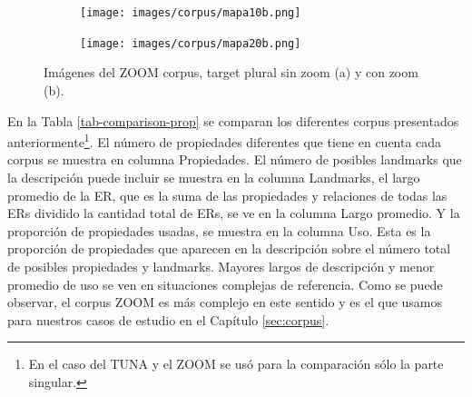 \begin{figure}[h]
\begin{subfigure}{.45\textwidth}
\centering
\texttt{[image: images/corpus/mapa10b.png]}\\[0pt]
\caption{}
\label{pluralx}
\end{subfigure}
\begin{subfigure}{.55\textwidth}
\centering
\texttt{[image: images/corpus/mapa20b.png]}\\[0pt]
\caption{}
\label{plural2x}
\end{subfigure}
\caption{Im\'agenes del ZOOM corpus, target plural sin zoom (a) y con zoom (b).}\label{imagenes-zoom-corpus}
\end{figure}

En la Tabla \ref{tab-comparison-prop} se comparan los diferentes corpus presentados anteriormente\footnote{En el caso del TUNA y el ZOOM se us\'o para la comparaci\'on s\'olo la parte singular.}. El n\'umero de propiedades diferentes que tiene en cuenta cada corpus se muestra en columna Propiedades. El n\'umero de posibles landmarks que la descripci\'on puede incluir se muestra en la columna Landmarks, el largo promedio de la ER, que es la suma de las propiedades y relaciones de todas las ERs  dividido la cantidad total de ERs, se ve en la columna Largo promedio. Y la proporci\'on de propiedades usadas, se muestra en la columna Uso. Esta es la proporci\'on de propiedades que aparecen en la descripci\'on sobre el n\'umero total de posibles propiedades y landmarks. Mayores largos de descripci\'on y menor promedio de uso se ven en situaciones complejas de referencia. Como se puede observar, el corpus ZOOM es m\'as complejo en este sentido y es el que usamos para nuestros casos de estudio en el Cap\'itulo \ref{sec:corpus}.

